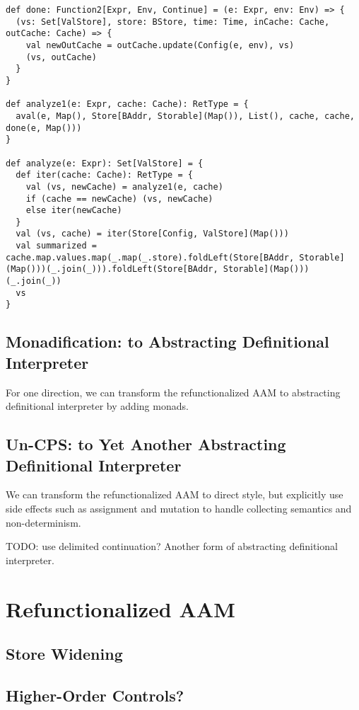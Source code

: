 \documentclass[acmsmall,review,anonymous]{acmart}\settopmatter{printfolios=true,printccs=false,printacmref=false}
\begin{document}
\begin{lstlisting}
def done: Function2[Expr, Env, Continue] = (e: Expr, env: Env) => {
  (vs: Set[ValStore], store: BStore, time: Time, inCache: Cache, outCache: Cache) => {
    val newOutCache = outCache.update(Config(e, env), vs)
    (vs, outCache)
  }
}

def analyze1(e: Expr, cache: Cache): RetType = {
  aval(e, Map(), Store[BAddr, Storable](Map()), List(), cache, cache, done(e, Map()))
}

def analyze(e: Expr): Set[ValStore] = {
  def iter(cache: Cache): RetType = {
    val (vs, newCache) = analyze1(e, cache)
    if (cache == newCache) (vs, newCache)
    else iter(newCache)
  }
  val (vs, cache) = iter(Store[Config, ValStore](Map()))
  val summarized = cache.map.values.map(_.map(_.store).foldLeft(Store[BAddr, Storable](Map()))(_.join(_))).foldLeft(Store[BAddr, Storable](Map()))(_.join(_))
  vs
}
\end{lstlisting}

\subsection{Monadification: to Abstracting Definitional Interpreter}

For one direction, we can transform the refunctionalized AAM to abstracting definitional interpreter
by adding monads.

\subsection{Un-CPS: to Yet Another Abstracting Definitional Interpreter}

We can transform the refunctionalized AAM to direct style, but explicitly use 
side effects such as assignment and mutation to handle collecting semantics and non-determinism.

TODO: use delimited continuation? 
Another form of abstracting definitional interpreter.

\section{Refunctionalized AAM}

\subsection{Store Widening}

\subsection{Higher-Order Controls?}
\end{document}
